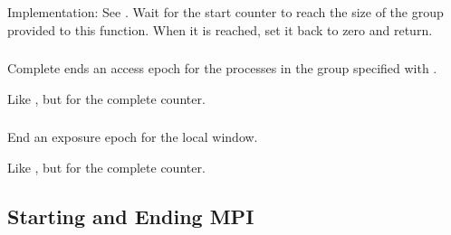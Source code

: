 \documentclass{article}
\begin{document}
Implementation:
See .  Wait for the start counter to reach the size of
the group provided to this function.  When it is reached, set it back to zero
and return.  


\subsubsection{}
Complete ends an access epoch for the processes in the group specified with
.

Like , but for the complete counter.

\subsubsection{}
End an exposure epoch for the local window.

Like , but for the complete counter.

\subsection{Starting and Ending MPI}

\subsubsection{}
\begin{adi3}
\end{adi3}
\end{document}
